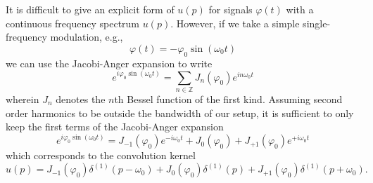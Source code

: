 It is difficult to give an explicit form of $u(p)$ for signals $\varphi(t)$ with a continuous frequency spectrum $u(p)$.
However, if we take a simple single-frequency modulation, e.g.,
\begin{equation}
	\varphi(t)
	=
	-
	\varphi_0
	\sin(\omega_0t)
\end{equation}
we can use the Jacobi-Anger expansion to write
\begin{equation}
	e^{i\varphi_0\sin(\omega_0t)}
	=
	\sum_{n\in\mathbb{Z}}
	J_n(\varphi_0)
	e^{in\omega_0 t}
\end{equation}
wherein $J_n$ denotes the $n$th Bessel function of the first kind.
Assuming second order harmonics to be outside the bandwidth of our setup, it is sufficient to only keep the first terms of the Jacobi-Anger expansion
\begin{equation}
	e^{i\varphi_0\sin(\omega_0t)}
	=
	J_{-1}(\varphi_0)
	e^{-i\omega_0t}
	+
	J_0(\varphi_0)
	+
	J_{+1}(\varphi_0)
	e^{+i\omega_0t}
\end{equation}
which corresponds to the convolution kernel
\begin{equation}
	u(p)
	=
	J_{-1}(\varphi_0)
	\delta^{(1)}(p-\omega_0)
	+
	J_0(\varphi_0)
	\delta^{(1)}(p)
	+
	J_{+1}(\varphi_0)
	\delta^{(1)}(p+\omega_0)
	.
\end{equation}
